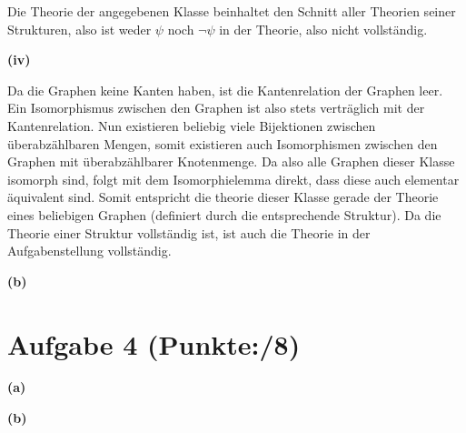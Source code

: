 \documentclass[11pt, a4paper]{article}
\newcommand{\ppp}{8}
\begin{document}
\begin{adjustwidth}{20pt}{20pt}
\begin{adjustwidth}{2em}{0em}
	Die Theorie der angegebenen Klasse beinhaltet den Schnitt aller Theorien seiner Strukturen, also ist weder $\psi$ noch $\neg\psi$ in der Theorie, also nicht vollständig.
\end{adjustwidth}
\textbf{(iv)}
\begin{adjustwidth}{2em}{0em}\vspace{-\baselineskip}
Da die Graphen keine Kanten haben, ist die Kantenrelation der Graphen leer. Ein Isomorphismus zwischen den Graphen ist also stets verträglich mit der Kantenrelation. Nun existieren beliebig viele
Bijektionen zwischen überabzählbaren Mengen, somit existieren auch Isomorphismen zwischen den Graphen mit überabzählbarer Knotenmenge. Da also alle Graphen dieser Klasse isomorph sind, folgt
mit dem Isomorphielemma direkt, dass diese auch elementar äquivalent sind. Somit entspricht die theorie dieser Klasse gerade der Theorie eines beliebigen Graphen (definiert durch die
entsprechende Struktur). Da die Theorie einer Struktur vollständig ist, ist auch die Theorie in der Aufgabenstellung vollständig. 
\end{adjustwidth}
\end{adjustwidth}
\textbf{(b)}
\begin{adjustwidth}{20pt}{20pt}
	
\end{adjustwidth}

\section*{Aufgabe 4 (Punkte:\qquad/\ppp)}
\textbf{(a)}
\begin{adjustwidth}{20pt}{20pt}
	
\end{adjustwidth}
\textbf{(b)}
\begin{adjustwidth}{20pt}{20pt}
	
\end{adjustwidth}
\end{document}

